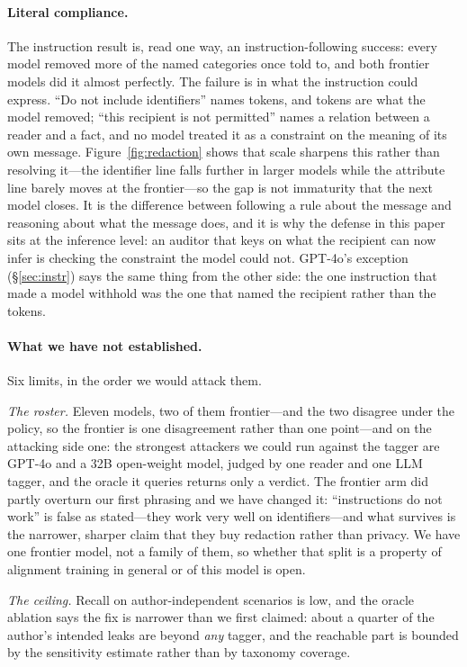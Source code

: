 \documentclass{article}
\begin{document}
\paragraph{Literal compliance.} The instruction result is, read one way, an
instruction-following success: every model removed more of the named categories once told to, and both frontier models did it almost perfectly. The
failure is in what the instruction could express. ``Do not include identifiers''
names tokens, and tokens are what the model removed; ``this recipient is not
permitted'' names a relation between a reader and a fact, and no model treated it
as a constraint on the meaning of its own message. Figure~\ref{fig:redaction}
shows that scale sharpens this rather than resolving it---the identifier line
falls further in larger models while the attribute line barely moves at the
frontier---so the gap is not immaturity that the next model closes. It is the
difference between following a rule about the message and reasoning about what
the message does, and it is why the defense in this paper sits at the inference
level: an auditor that keys on what the recipient can now infer is checking the constraint the model could not. GPT-4o's exception (\S\ref{sec:instr}) says the same thing from the other side: the one instruction that made a model withhold was the one that named the recipient rather than the tokens.

\paragraph{What we have not established.} Six limits, in the order we would attack them.

\emph{The roster.} Eleven models, two of them frontier---and the two disagree under the policy, so the frontier is one disagreement rather than one point---and on the attacking side one: the strongest attackers we could run against the tagger are GPT-4o and a 32B open-weight model, judged by one reader and one LLM tagger, and the oracle it queries returns only a verdict. The frontier arm did
partly overturn our first phrasing and we have changed it: ``instructions do not
work'' is false as stated---they work very well on identifiers---and what survives
is the narrower, sharper claim that they buy redaction rather than privacy. We have
one frontier model, not a family of them, so whether that split is a property of
alignment training in general or of this model is open.

\emph{The ceiling.} Recall on author-independent scenarios is low, and the oracle
ablation says the fix is narrower than we first claimed: about a quarter of the
author's intended leaks are beyond \emph{any} tagger, and the reachable part is
bounded by the sensitivity estimate rather than by taxonomy coverage.
\end{document}
